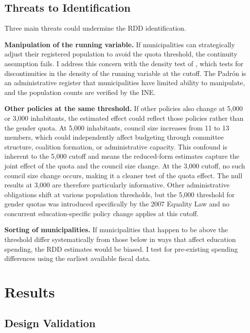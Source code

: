 \documentclass[12pt]{article}
\begin{document}
\subsection{Threats to Identification}

Three main threats could undermine the RDD identification.

\textbf{Manipulation of the running variable.} If municipalities can strategically adjust their registered population to avoid the quota threshold, the continuity assumption fails. I address this concern with the density test of \citet{cattaneo2020simple}, which tests for discontinuities in the density of the running variable at the cutoff. The Padr\'{o}n is an administrative register that municipalities have limited ability to manipulate, and the population counts are verified by the INE.

\textbf{Other policies at the same threshold.} If other policies also change at 5,000 or 3,000 inhabitants, the estimated effect could reflect those policies rather than the gender quota. At 5,000 inhabitants, council size increases from 11 to 13 members, which could independently affect budgeting through committee structure, coalition formation, or administrative capacity. This confound is inherent to the 5,000 cutoff and means the reduced-form estimates capture the joint effect of the quota and the council size change. At the 3,000 cutoff, no such council size change occurs, making it a cleaner test of the quota effect. The null results at 3,000 are therefore particularly informative. Other administrative obligations shift at various population thresholds, but the 5,000 threshold for gender quotas was introduced specifically by the 2007 Equality Law and no concurrent education-specific policy change applies at this cutoff.

\textbf{Sorting of municipalities.} If municipalities that happen to be above the threshold differ systematically from those below in ways that affect education spending, the RDD estimates would be biased. I test for pre-existing spending differences using the earliest available fiscal data.


\section{Results}

\subsection{Design Validation}
\label{sec:validation}
\end{document}
